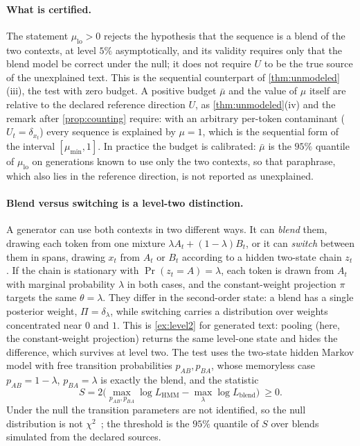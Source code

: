 \documentclass[11pt]{article}
\theoremstyle{definition}
\theoremstyle{remark}
\begin{document}
\paragraph{What is certified.} The statement $\mu_{\mathrm{lo}}>0$ rejects the hypothesis that the
sequence is a blend of the two contexts, at level $5\%$ asymptotically, and its validity requires
only that the blend model be correct under the null; it does not require $U$ to be the true source
of the unexplained text. This is the sequential counterpart of \cref{thm:unmodeled}(iii), the test
with zero budget. A positive budget $\bar\mu$ and the value of $\mu$ itself are relative to the
declared reference direction $U$, as \cref{thm:unmodeled}(iv) and the remark after
\cref{prop:counting} require: with an arbitrary per-token contaminant ($U_t=\delta_{x_t}$) every
sequence is explained by $\mu=1$, which is the sequential form of the interval $[\mu_{\min},1]$.
In practice the budget is calibrated: $\bar\mu$ is the $95\%$ quantile of $\mu_{\mathrm{lo}}$ on
generations known to use only the two contexts, so that paraphrase, which also lies in the
reference direction, is not reported as unexplained.

\paragraph{Blend versus switching is a level-two distinction.} A generator can use both contexts in
two different ways. It can \emph{blend} them, drawing each token from one mixture
$\lambda A_t+(1-\lambda)B_t$, or it can \emph{switch} between them in spans, drawing $x_t$ from $A_t$
or $B_t$ according to a hidden two-state chain $z_t$. If the chain is stationary with
$\Pr(z_t=A)=\lambda$, each token is drawn from $A_t$ with marginal probability $\lambda$ in both
cases, and the constant-weight projection $\pi$ targets the same $\theta=\lambda$. They differ in the second-order state: a blend has a single posterior
weight, $\Pi=\delta_\lambda$, while switching carries a distribution over weights concentrated near
$0$ and $1$. This is \cref{ex:level2} for generated text: pooling (here, the constant-weight
projection) returns the same level-one state and hides the difference, which survives at level two.
The test uses the two-state hidden Markov model with free transition probabilities $p_{AB},p_{BA}$,
whose memoryless case $p_{AB}=1-\lambda$, $p_{BA}=\lambda$ is exactly the blend, and the statistic
\[
S=2\Big(\max_{p_{AB},p_{BA}}\log L_{\mathrm{HMM}}-\max_\lambda\log L_{\mathrm{blend}}\Big)\ \ge0.
\]
Under the null the transition parameters are not identified, so the null distribution is not
$\chi^2$~\cite{Davies1977}; the threshold is the $95\%$ quantile of $S$ over blends simulated from
the declared sources.
\end{document}
